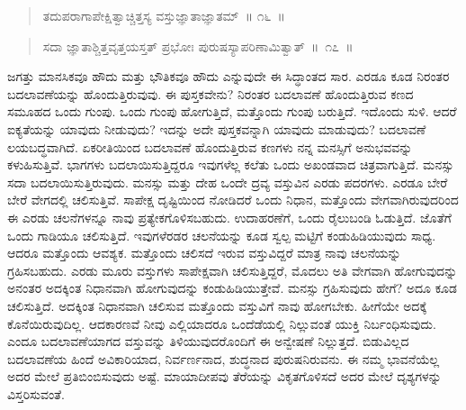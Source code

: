 \vspace{-0.3cm}

\begin{verse}
ತದುಪರಾಗಾಪೇಕ್ಷಿತ್ವಾಚ್ಚಿತ್ತಸ್ಯ ವಸ್ತುಜ್ಞಾತಾಜ್ಞಾತಮ್​~॥ ೧೬~॥
\end{verse}

\vspace{-0.3cm}


\vspace{-0.3cm}

\begin{verse}
ಸದಾ ಜ್ಞಾತಾಶ್ಚಿತ್ತವೃತ್ತಯಸ್ತತ್​ ಪ್ರಭೋಃ ಪುರುಷಸ್ಯಾಪರಿಣಾಮಿತ್ವಾತ್​~॥~೧೭~॥
\end{verse}

\vspace{-0.3cm}


ಜಗತ್ತು ಮಾನಸಿಕವೂ ಹೌದು ಮತ್ತು ಭೌತಿಕವೂ ಹೌದು ಎನ್ನುವುದೇ ಈ ಸಿದ್ಧಾಂತದ ಸಾರ. ಎರಡೂ ಕೂಡ ನಿರಂತರ ಬದಲಾವಣೆಯನ್ನು ಹೊಂದುತ್ತಿರುವುವು. ಈ ಪುಸ್ತಕವೇನು? ನಿರಂತರ ಬದಲಾವಣೆ ಹೊಂದುತ್ತಿರುವ ಕಣದ ಸಮೂಹದ ಒಂದು ಗುಂಪು. ಒಂದು ಗುಂಪು ಹೋಗುತ್ತಿದೆ, ಮತ್ತೊಂದು ಗುಂಪು ಬರುತ್ತಿದೆ. ಇದೊಂದು ಸುಳಿ. ಆದರೆ ಐಕ್ಯತೆಯನ್ನು ಯಾವುದು ನೀಡುವುದು? ಇದನ್ನು ಅದೇ ಪುಸ್ತಕವನ್ನಾಗಿ ಯಾವುದು ಮಾಡುವುದು? ಬದಲಾವಣೆ ಲಯಬದ್ಧವಾಗಿದೆ. ಏಕರೀತಿಯಿಂದ ಬದಲಾವಣೆ ಹೊಂದುತ್ತಿರುವ ಕಣಗಳು ನನ್ನ ಮನಸ್ಸಿಗೆ ಅನುಭವವನ್ನು ಕಳುಹಿಸುತ್ತಿವೆ. ಭಾಗಗಳು ಬದಲಾಯಿಸುತ್ತಿದ್ದರೂ ಇವುಗಳೆಲ್ಲ ಕಲೆತು ಒಂದು ಅಖಂಡವಾದ ಚಿತ್ರವಾಗುತ್ತಿದೆ. ಮನಸ್ಸು ಸದಾ ಬದಲಾಯಿಸುತ್ತಿರುವುದು. ಮನಸ್ಸು ಮತ್ತು ದೇಹ ಒಂದೇ ದ್ರವ್ಯ ವಸ್ತುವಿನ ಎರಡು ಪದರಗಳು. ಎರಡೂ ಬೇರೆ ಬೇರೆ ವೇಗದಲ್ಲಿ ಚಲಿಸುತ್ತಿವೆ. ಸಾಪೇಕ್ಷ ದೃಷ್ಟಿಯಿಂದ ನೋಡಿದರೆ ಒಂದು ನಿಧಾನ, ಮತ್ತೊಂದು ವೇಗವಾಗಿರುವುದರಿಂದ ಈ ಎರಡು ಚಲನೆಗಳನ್ನೂ ನಾವು ಪ್ರತ್ಯೇಕಗೊಳಿಸಬಹುದು. ಉದಾಹರಣೆಗೆ, ಒಂದು ರೈಲುಬಂಡಿ ಓಡುತ್ತಿದೆ. ಜೊತೆಗೆ ಒಂದು ಗಾಡಿಯೂ ಚಲಿಸುತ್ತಿದೆ. ಇವುಗಳೆರಡರ ಚಲನೆಯನ್ನು ಕೂಡ ಸ್ವಲ್ಪ ಮಟ್ಟಿಗೆ ಕಂಡುಹಿಡಿಯುವುದು ಸಾಧ್ಯ. ಆದರೂ ಮತ್ತೊಂದು ಆವಶ್ಯಕ. ಮತ್ತೊಂದು ಚಲಿಸದೆ ಇರುವ ವಸ್ತುವಿದ್ದರೆ ಮಾತ್ರ ನಾವು ಚಲನೆಯನ್ನು ಗ್ರಹಿಸಬಹುದು. ಎರಡು ಮೂರು ವಸ್ತುಗಳು ಸಾಪೇಕ್ಷವಾಗಿ ಚಲಿಸುತ್ತಿದ್ದರೆ, ಮೊದಲು ಅತಿ ವೇಗವಾಗಿ ಹೋಗುವುದನ್ನು ಅನಂತರ ಅದಕ್ಕಿಂತ ನಿಧಾನವಾಗಿ ಹೋಗುವುದನ್ನು ಕಂಡುಹಿಡಿಯುತ್ತೇವೆ. ಮನಸ್ಸು ಗ್ರಹಿಸುವುದು ಹೇಗೆ? ಅದೂ ಕೂಡ ಚಲಿಸುತ್ತಿದೆ. ಅದಕ್ಕಿಂತ ನಿಧಾನವಾಗಿ ಚಲಿಸುವ ಮತ್ತೊಂದು ವಸ್ತುವಿಗೆ ನಾವು ಹೋಗಬೇಕು. ಹೀಗೆಯೇ ಅದಕ್ಕೆ ಕೊನೆಯಿರುವುದಿಲ್ಲ. ಆದಕಾರಣವೆ ನೀವು ಎಲ್ಲಿಯಾದರೂ ಒಂದೆಡೆಯಲ್ಲಿ ನಿಲ್ಲುವಂತೆ ಯುಕ್ತಿ ನಿರ್ಬಂಧಿಸುವುದು. ಎಂದೂ ಬದಲಾವಣೆಯಾಗದ ವಸ್ತುವನ್ನು ತಿಳಿಯುವುದರೊಂದಿಗೆ ಈ ಅನ್ವೇಷಣೆ ನಿಲ್ಲುತ್ತದೆ. ಬಿಡುವಿಲ್ಲದ ಬದಲಾವಣೆಯ ಹಿಂದೆ ಅವಿಕಾರಿಯಾದ, ನಿರ್ವರ್ಣನಾದ, ಶುದ್ಧನಾದ ಪುರುಷನಿರುವನು. ಈ ನಮ್ಮ ಭಾವನೆಯೆಲ್ಲ ಅದರ ಮೇಲೆ ಪ್ರತಿಬಿಂಬಿಸುವುದು ಅಷ್ಟೆ. ಮಾಯಾದೀಪವು ತೆರೆಯನ್ನು ವಿಕೃತಗೊಳಿಸದೆ ಅದರ ಮೇಲೆ ದೃಶ್ಯಗಳನ್ನು ವಿಸ್ತರಿಸುವಂತೆ. 

